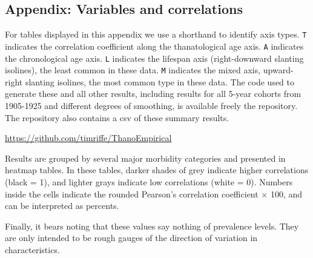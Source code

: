 \documentclass[11pt,oneside]{article} %
\begin{document}
\singlespacing

   
%  

%
\begin{appendices}
\section*{Appendix: Variables and correlations}

For tables displayed in this appendix we use a shorthand to identify axis types.
\texttt{T} indicates the correlation coefficient along the thanatological age axis.
\texttt{A} indicates the chronological age axis. \texttt{L} indicates the lifespan axis
(right-downward slanting isolines), the least common in these data. \texttt{M}
indicates the mixed axis, upward-right slanting isolines, the most common type
in these data.
The code used to generate these and all other results, including results for all 5-year cohorts from 1905-1925 and different
degrees of smoothing, is available freely the repository. The repository
also contains a csv of these summary results.

\url{https://github.com/timriffe/ThanoEmpirical}

Results are grouped by several major morbidity categories and presented in
heatmap tables. In these tables, darker shades of grey indicate higher
correlations (black = 1), and lighter grays indicate low correlations
(white = 0). Numbers inside the cells indicate the rounded Pearson's correlation
coefficient $\times$ 100, and can be interpreted as percents. 

Finally, it bears noting that these values say nothing of prevalence levels.
They are only intended to be rough gauges of the direction of variation in characteristics.

\listoftables


\end{appendices}
\end{document}
